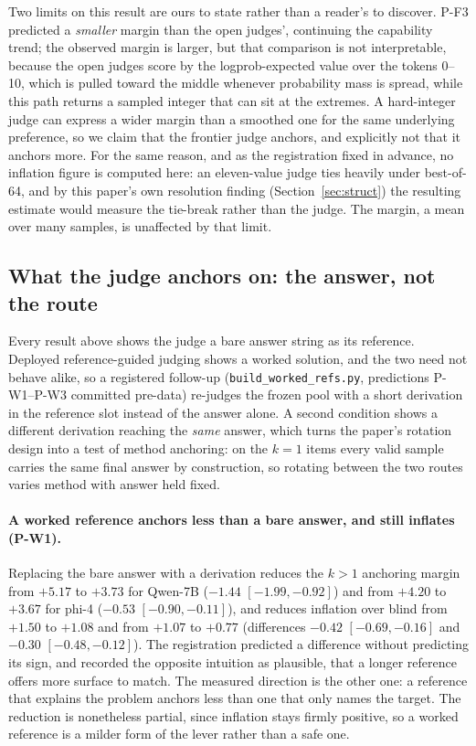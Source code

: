 \documentclass[11pt]{article}
\begin{document}
Two limits on this result are ours to state rather than a reader's to discover.
P-F3 predicted a \emph{smaller} margin than the open judges', continuing the capability trend; the observed margin is larger, but that comparison is not interpretable, because the open judges score by the logprob-expected value over the tokens 0--10, which is pulled toward the middle whenever probability mass is spread, while this path returns a sampled integer that can sit at the extremes.
A hard-integer judge can express a wider margin than a smoothed one for the same underlying preference, so we claim that the frontier judge anchors, and explicitly not that it anchors more.
For the same reason, and as the registration fixed in advance, no inflation figure is computed here: an eleven-value judge ties heavily under best-of-64, and by this paper's own resolution finding (Section~\ref{sec:struct}) the resulting estimate would measure the tie-break rather than the judge.
The margin, a mean over many samples, is unaffected by that limit.

\FloatBarrier
\subsection{What the judge anchors on: the answer, not the route}
\label{sec:worked}

Every result above shows the judge a bare answer string as its reference.
Deployed reference-guided judging shows a worked solution, and the two need not behave alike, so a registered follow-up (\texttt{build\_worked\_refs.py}, predictions P-W1--P-W3 committed pre-data) re-judges the frozen pool with a short derivation in the reference slot instead of the answer alone.
A second condition shows a different derivation reaching the \emph{same} answer, which turns the paper's rotation design into a test of method anchoring: on the $k{=}1$ items every valid sample carries the same final answer by construction, so rotating between the two routes varies method with answer held fixed.

\paragraph{A worked reference anchors less than a bare answer, and still inflates (P-W1).}
Replacing the bare answer with a derivation reduces the $k{>}1$ anchoring margin from $+5.17$ to $+3.73$ for Qwen-7B ($-1.44$ $[-1.99,-0.92]$) and from $+4.20$ to $+3.67$ for phi-4 ($-0.53$ $[-0.90,-0.11]$), and reduces inflation over blind from $+1.50$ to $+1.08$ and from $+1.07$ to $+0.77$ (differences $-0.42$ $[-0.69,-0.16]$ and $-0.30$ $[-0.48,-0.12]$).
The registration predicted a difference without predicting its sign, and recorded the opposite intuition as plausible, that a longer reference offers more surface to match.
The measured direction is the other one: a reference that explains the problem anchors less than one that only names the target.
The reduction is nonetheless partial, since inflation stays firmly positive, so a worked reference is a milder form of the lever rather than a safe one.
\end{document}
